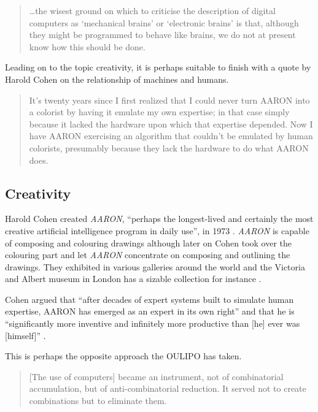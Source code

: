 \begin{quotation}
  \ldots the wisest ground on which to criticise the description of digital computers as `mechanical brains' or `electronic brains' is that, although they might be programmed to behave like brains, we do not at present know how this should be done.  
\end{quotation}

Leading on to the topic creativity, it is perhaps suitable to finish with a quote by Harold Cohen on the relationship of machines and humans.

\begin{quotation}
  It's twenty years since I first realized that I could never turn AARON into a colorist by having it emulate my own expertise; in that case simply because it lacked the hardware upon which that expertise depended. Now I have AARON exercising an algorithm that couldn't be emulated by human colorists, presumably because they lack the hardware to do what AARON does. 
\end{quotation}


\subsection{Creativity}

Harold Cohen created \textit{AARON}, ``perhaps the longest-lived and certainly the most creative artificial intelligence program in daily use'', in 1973 \citeyear{Cohen2016}. \textit{AARON} is capable of composing and colouring drawings although later on Cohen took over the colouring part and let \textit{AARON} concentrate on composing and outlining the drawings. They exhibited in various galleries around the world and the Victoria and Albert museum in London has a sizable collection for instance \autocite{VA2016}.

Cohen argued that ``after decades of expert systems built to simulate human expertise, AARON has emerged as an expert in its own right'' and that he is ``significantly more inventive and infinitely more productive than [he] ever was [himself]'' \citeyear{Cohen2007}.

This is perhaps the opposite approach the \ac{OULIPO} has taken.

\begin{quotation}
  [The use of computers] became an instrument, not of combinatorial accumulation, but of anti-combinatorial reduction. It served not to create combinations but to eliminate them. 
\end{quotation}


